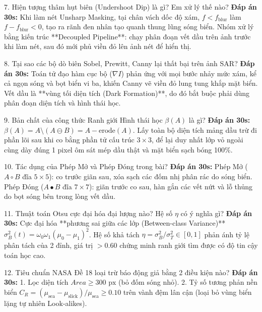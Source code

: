 \documentclass[11pt,a4paper]{article}
\begin{document}
\begin{qabox}{7. Hiện tượng thâm hụt biên (Undershoot Dip) là gì? Em xử lý thế nào?}
\textbf{Đáp án 30s:} Khi làm nét Unsharp Masking, tại chân vách dốc độ xám, $f < f_{\text{blur}}$ làm $f - f_{\text{blur}} < 0$, tạo ra rãnh đen nhân tạo quanh thung lũng sóng biển. Nhóm xử lý bằng kiến trúc **Decoupled Pipeline**: chạy phân đoạn vết dầu trên ảnh trước khi làm nét, sau đó mới phủ viền đỏ lên ảnh nét để hiển thị.
\end{qabox}

\begin{qabox}{8. Tại sao các bộ dò biên Sobel, Prewitt, Canny lại thất bại trên ảnh SAR?}
\textbf{Đáp án 30s:} Toán tử đạo hàm cục bộ ($\nabla I$) phản ứng với mọi bước nhảy mức xám, kể cả ngọn sóng và bọt biển vi ba, khiến Canny vẽ viền đỏ lung tung khắp mặt biển. Vết dầu là **vùng tối diện tích (Dark Formation)**, do đó bắt buộc phải dùng phân đoạn diện tích và hình thái học.
\end{qabox}

\begin{qabox}{9. Bản chất của công thức Ranh giới Hình thái học $\beta(A)$ là gì?}
\textbf{Đáp án 30s:} $\beta(A) = A \setminus (A \ominus B) = A - \text{erode}(A)$. Lấy toàn bộ diện tích mảng dầu trừ đi phần lõi sau khi co bằng phần tử cấu trúc $3 \times 3$, để lại duy nhất lớp vỏ ngoài cùng dày đúng 1 pixel ôm sát mép dầu thật và mặt biển sạch bóng 100\%.
\end{qabox}

\begin{qabox}{10. Tác dụng của Phép Mở và Phép Đóng trong bài?}
\textbf{Đáp án 30s:} Phép Mở ($A \circ B$ đĩa $5 \times 5$): co trước giãn sau, xóa sạch các đốm nhị phân rác do sóng biển. Phép Đóng ($A \bullet B$ đĩa $7 \times 7$): giãn trước co sau, hàn gắn các vết nứt và lỗ thủng do bọt sóng bên trong lòng vết dầu.
\end{qabox}

\begin{qabox}{11. Thuật toán Otsu cực đại hóa đại lượng nào? Hệ số $\eta$ có ý nghĩa gì?}
\textbf{Đáp án 30s:} Cực đại hóa **phương sai giữa các lớp (Between-class Variance)** $\sigma_B^2(t) = \omega_0 \omega_1 (\mu_0 - \mu_1)^2$. Hệ số khả tách $\eta = \sigma_B^2 / \sigma_T^2 \in [0, 1]$ phản ánh tỷ lệ phân tách của 2 đỉnh, giá trị $> 0.60$ chứng minh ranh giới tìm được có độ tin cậy toán học cao.
\end{qabox}

\begin{qabox}{12. Tiêu chuẩn NASA Đề 18 loại trừ báo động giả bằng 2 điều kiện nào?}
\textbf{Đáp án 30s:} 1. Lọc diện tích $Area \ge 300\text{ px}$ (bỏ đốm sóng nhỏ). 2. Tỷ số tương phản nền biển $C_R = (\mu_{\text{sea}} - \mu_{\text{slick}}) / \mu_{\text{sea}} \ge 0.10$ trên vành đệm lân cận (loại bỏ vùng biển lặng tự nhiên Look-alikes).
\end{qabox}
\end{document}
